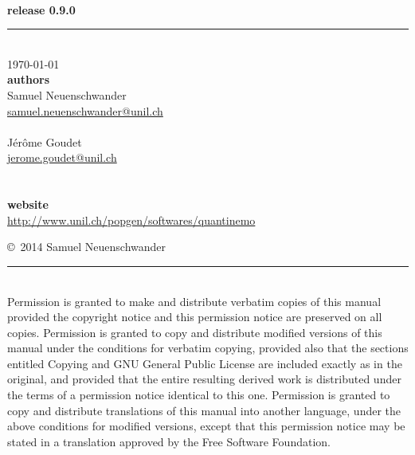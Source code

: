 \documentclass[letterpaper,12pt,oneside]{book}
\begin{document}
\begin{titlepage}
\begin{flushright}
\bfseries{}\\
\Large release 0.9.0
\end{flushright}
\noindent\rule{\linewidth}{1.5pt}

\\[40pt]
\today\\[20pt]
\textbf{authors}\\
Samuel Neuenschwander\\
\href{mailto:samuel.neuenschwander@unil.ch}{samuel.neuenschwander@unil.ch}\\
\\
J\'er\^ome Goudet\\
\href{mailto:jerome.goudet@unil.ch}{jerome.goudet@unil.ch}\\
\\
\\
\textbf{website}\\
\url{http://www.unil.ch/popgen/softwares/quantinemo}\\

\end{titlepage}

\copyright~2014 Samuel Neuenschwander\\
\noindent\rule{\linewidth}{1pt}\\
{\small Permission is granted to make and distribute verbatim copies of this manual provided the copyright notice and this 
permission notice are preserved on all copies. Permission is granted to copy and distribute modified versions of this 
manual under the conditions for verbatim copying, provided also that the sections entitled Copying and GNU General 
Public License are included exactly as in the original, and provided that the entire resulting derived work is distributed 
under the terms of a permission notice identical to this one. Permission is granted to copy and distribute translations 
of this manual into another language, under the above conditions for modified versions, except that this permission 
notice may be stated in a translation approved by the Free Software Foundation.}
\end{document}
